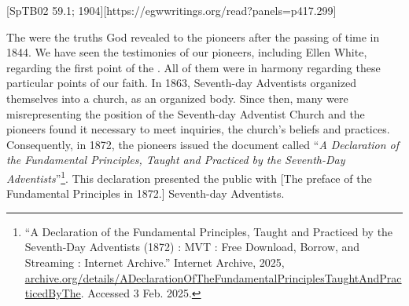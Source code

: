 [SpTB02 59.1; 1904][https://egwwritings.org/read?panels=p417.299]


The  were the truths God revealed to the pioneers after the passing of time in 1844. We have seen the testimonies of our pioneers, including Ellen White, regarding the first point of the . All of them were in harmony regarding these particular points of our faith. In 1863, Seventh-day Adventists organized themselves into a church, as an organized body. Since then, many were misrepresenting the position of the Seventh-day Adventist Church and the pioneers found it necessary to meet inquiries,  the church’s beliefs and practices. Consequently, in 1872, the pioneers issued the document called “\textit{A Declaration of the Fundamental Principles, Taught and Practiced by the Seventh-Day Adventists}”\footnote{“A Declaration of the Fundamental Principles, Taught and Practiced by the Seventh-Day Adventists (1872) : MVT : Free Download, Borrow, and Streaming : Internet Archive.” Internet Archive, 2025, \href{https://archive.org/details/ADeclarationOfTheFundamentalPrinciplesTaughtAndPracticedByThe}{archive.org/details/ADeclarationOfTheFundamentalPrinciplesTaughtAndPracticedByThe}. Accessed 3 Feb. 2025.}. This declaration presented the public with [The preface of the Fundamental Principles in 1872.] Seventh-day Adventists.


